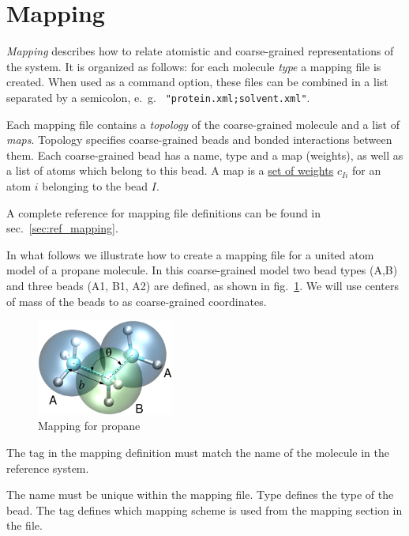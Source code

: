 \section{Mapping}
\label{sec:mapping}

{\em Mapping} describes how to relate atomistic and coarse-grained representations of the system. It is organized as follows: for each molecule {\em type} a mapping file is created. When used as a command option, these files can be combined in a list separated by a semicolon, e.~g. ~\texttt{"protein.xml;solvent.xml"}. 

Each mapping file contains a {\em topology} of the coarse-grained molecule and a list of {\em maps}. Topology specifies coarse-grained beads and bonded interactions between them. Each coarse-grained bead has a name, type and a map (weights), as well as a list of atoms which belong to this bead. A map is a \hyperref[sec:mapping_operator]{set of weights} $c_{Ii}$ for an atom $i$ belonging to the bead $I$. 

A complete reference for mapping file definitions can be found in sec.~\ref{sec:ref_mapping}. 

In what follows we illustrate how to create a mapping file for a united atom model of a propane molecule. In this coarse-grained model two bead types (A,B) and three beads (A1, B1, A2) are defined, as shown in fig.~\ref{fig:propane_map}. We will use centers of mass of the beads to as  coarse-grained coordinates.


\begin{figure}[ht]
  \includegraphics[width=0.4\textwidth]{functionality/fig/propane.eps}
  \caption{Mapping for propane
  \label{fig:propane_map}
}
\end{figure}



The  tag in the mapping definition must match the name of the molecule in the reference system.

The name must be unique within the mapping file. Type defines the type of the bead. The  tag defines which mapping scheme is used from the mapping section in the file. 

